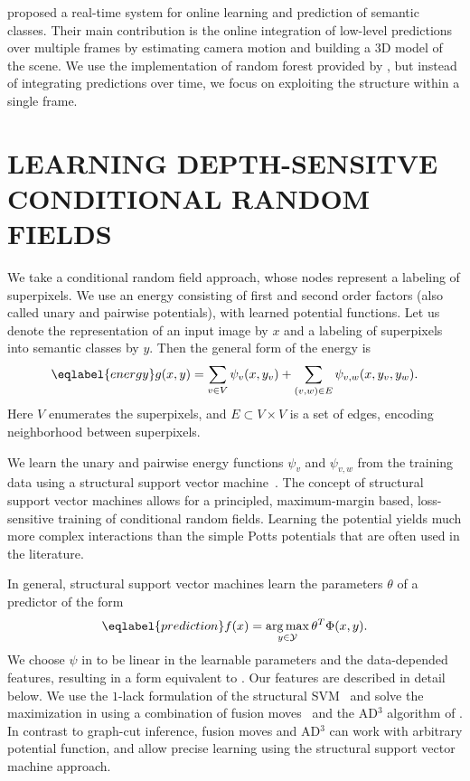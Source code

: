 \documentclass[a4paper, 10pt, conference]{ieeeconf}      %
\DeclareMathOperator*{\argmax}{arg\,max}
\begin{document}
\citet{stueckler2013} proposed a real-time system for online learning and prediction of semantic classes.
Their main contribution is the online integration of low-level predictions over multiple frames
by estimating camera motion and building a 3D model of the scene.
We use the implementation of random forest provided by \citet{stueckler2013}, but instead of
integrating predictions over time, we focus on exploiting the structure within a single frame.

\section{LEARNING DEPTH-SENSITVE CONDITIONAL RANDOM FIELDS}
We take a conditional random field approach, whose nodes represent a labeling of
superpixels.  We use an energy consisting of first and second order factors
(also called unary and pairwise potentials), with learned potential functions.
Let us denote the representation of an input image by $x$ and a labeling of
superpixels into semantic classes by $y$.  Then the general form of the energy is
\begin{equation}\eqlabel{energy}
    g(x, y) = \sum_{v \in V} \psi_v(x, y_v) + \sum_{(v, w) \in E} \psi_{v,w}(x, y_{v}, y_{w}).
\end{equation}
Here $V$ enumerates the superpixels, and $E\subset V \times V$ is a set of
edges, encoding neighborhood between superpixels.

We learn the unary and pairwise energy functions $\psi_v$ and $\psi_{v, w}$ from the training data
using a structural support vector machine~\citep{joachims2009cutting}. 
The concept of structural support vector machines allows for a principled,
maximum-margin based, loss-sensitive training of conditional random fields. Learning the potential yields much
more complex interactions than the simple Potts potentials that are often used in the literature.

In general, structural support vector machines learn the parameters $\theta$ of a predictor of the form
\begin{equation}\eqlabel{prediction}
f(x) = \argmax_{y \in \mathcal{Y}} \theta^T \Phi(x, y).
\end{equation}
We choose $\psi$ in  to be linear in the learnable parameters and
the data-depended features, resulting in a form equivalent to
. Our features are described in detail below.  We use the
$1$-lack formulation of the structural SVM~\citep{joachims2009cutting} and
solve the maximization in  using a combination of fusion
moves~\citep{lempitsky2010fusion} and the AD$^3$ algorithm of
\citet{martins2011augmented}.  In contrast to graph-cut inference, fusion moves
and AD$^3$ can work with arbitrary potential function, and allow precise
learning using the structural support vector machine approach.
\end{document}

